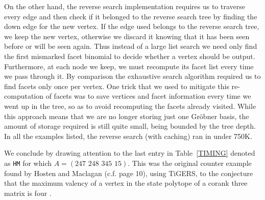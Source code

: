 \documentclass[11pt]{article}
\begin{document}
On the other hand, the reverse search implementation requires
us to traverse every edge and then check if it belonged to the reverse
search tree by finding the down edge for the new vertex. 
If the edge used belongs to the reverse search tree, we keep the new vertex, 
otherwise we discard it knowing that it has been seen before or will
be seen again. Thus instead of a large list search
we need only find the first mismarked facet binomial to decide whether
a vertex should be output. Furthermore, at each node we keep, we must 
recompute its facet list every time we pass through it. By comparison 
the exhaustive search algorithm required us to find facets only once per 
vertex. One trick that we used to mitigate this
re-computation of facets was to save vertices and facet information
every time we went up in the tree,
so as to avoid recomputing the facets already visited. While this
approach means that we are no longer storing just one Gr\"obner basis, the
amount of storage required is still quite small, being bounded by the
tree depth.  In all the examples listed, the reverse search 
(with caching) ran in under 750K.

We conclude by drawing attention to the last entry in
Table~\ref{TIMING} denoted as {\tt HM} for which $A =
(247\,\,248\,\,345\,\,15)$. This was the original counter example found by 
Hosten and Maclagan (c.f. page 10), using TiGERS, to the conjecture
that the maximum valency of a vertex in the state polytope of a corank 
three matrix is four \cite{ST}. 
\end{document}
